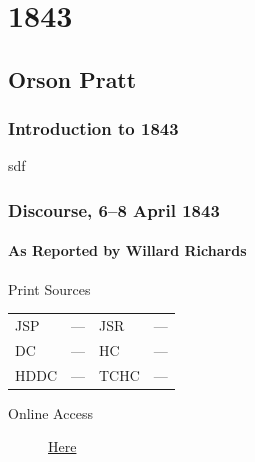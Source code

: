 \section{1843}

	\subsection{Orson Pratt}
		\label{EMS-1843-OP}

		\subsubsection{Introduction to 1843}
		
			sdf
			
		\subsubsection{Discourse, 6--8 April 1843}
			\label{EMS-1843-OP-6-8-APR-1843}
			
			\paragraph{As Reported by Willard Richards}
				\label{EMS-1843-OP-6-8-APR-1843-WR}
			
				\begin{description}
					\item[Print Sources]
				\end{description}

					\begin{tabular}{p{0.5in}p{1in}p{0.5in}p{1in}}
					JSP	 	& ---		& JSR 		& --- \\
					DC	 	& ---		& HC 		& --- \\
					HDDC 	& ---		& TCHC 		& --- \\
					\end{tabular}
				
				\begin{description}
					\item[Online Access] \href{https://www.josephsmithpapers.org/paper-summary/minutes-and-discourses-6-8-april-1843/1}{Here}
				\end{description}
				
